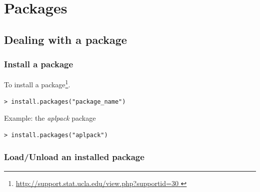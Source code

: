 
\chapter{Packages}
\label{chap:packages}


\section{Dealing with a package}
\label{sec:dealing-with-package}

\subsection{Install a package}
\label{sec:install-package-1}


To install a package\footnote{\url{http://support.stat.ucla.edu/view.php?supportid=30 
}}.

\begin{lstlisting}
> install.packages("package_name")
\end{lstlisting}

Example: the {\it aplpack} package 
\begin{lstlisting}
> install.packages("aplpack")
\end{lstlisting}

\subsection{Load/Unload an installed package}
\label{sec:load-an-inst}


